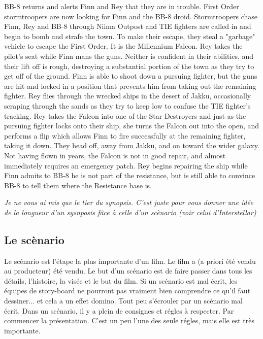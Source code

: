 \documentclass{article}
\begin{document}
BB-8 returns and alerts Finn and Rey that they are in trouble. First Order stormtroopers are now looking for Finn and the BB-8 droid. Stormtroopers chase Finn, Rey and BB-8 through Niima Outpost and TIE fighters are called in and begin to bomb and strafe the town. To make their escape, they steal a "garbage" vehicle to escape the First Order. It is the Millennium Falcon. Rey takes the pilot's seat while Finn mans the guns. Neither is confident in their abilities, and their lift off is rough, destroying a substantial portion of the town as they try to get off of the ground. Finn is able to shoot down a pursuing fighter, but the guns are hit and locked in a position that prevents him from taking out the remaining fighter. Rey flies through the wrecked ships in the desert of Jakku, occasionally scraping through the sands as they try to keep low to confuse the TIE fighter's tracking. Rey takes the Falcon into one of the Star Destroyers and just as the pursuing fighter locks onto their ship, she turns the Falcon out into the open, and performs a flip which allows Finn to fire successfully at the remaining fighter, taking it down. They head off, away from Jakku, and on toward the wider galaxy. Not having flown in years, the Falcon is not in good repair, and almost immediately requires an emergency patch. Rey begins repairing the ship while Finn admits to BB-8 he is not part of the resistance, but is still able to convince BB-8 to tell them where the Resistance base is.
\medskip

\textit{Je ne vous ai mis que le tier du synopsis. C'est juste pour vous donner une idée de la longueur d'un sysnposis fâce à celle d'un scènario (voir celui d'Interstellar)}

\clearpage

	\subsection{Le scènario}
Le scénario est l'étape la plus importante d'un film. Le film a (a priori été vendu au producteur) été vendu. Le but d'un scénario est de faire passer dans tous les détails, l'histoire, la visée et le but du film. Si un scénario est mal écrit, les équipes de story-board ne pourront pas vraiment bien comprendre ce qu'il faut dessiner... et cela a un effet domino. Tout peu s'écrouler par un scénario mal écrit. Dans un scénario, il y a plein de consignes et régles à respecter. Par commencer la présentation. C'est un peu l'une des seule régles, mais elle est très importante. 
\end{document}
